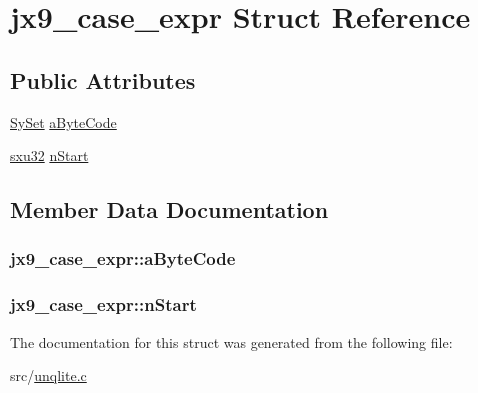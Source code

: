 \hypertarget{structjx9__case__expr}{\section{jx9\-\_\-case\-\_\-expr Struct Reference}
\label{d9/dd6/structjx9__case__expr}
}
\subsection*{Public Attributes}
\begin{DoxyCompactItemize}
\item 
\hyperlink{struct_sy_set}{Sy\-Set} \hyperlink{structjx9__case__expr_a7ab82c6423bf03840acb775e865c2f8e}{a\-Byte\-Code}
\item 
\hyperlink{unqlite_8c_abc5a8a3f345c200c98c485551f49666e}{sxu32} \hyperlink{structjx9__case__expr_ab12f71001095680b816069f5912ca694}{n\-Start}
\end{DoxyCompactItemize}


\subsection{Member Data Documentation}
\hypertarget{structjx9__case__expr_a7ab82c6423bf03840acb775e865c2f8e}{
\subsubsection[{a\-Byte\-Code}]{ jx9\-\_\-case\-\_\-expr\-::a\-Byte\-Code}}\label{d9/dd6/structjx9__case__expr_a7ab82c6423bf03840acb775e865c2f8e}
\hypertarget{structjx9__case__expr_ab12f71001095680b816069f5912ca694}{
\subsubsection[{n\-Start}]{ jx9\-\_\-case\-\_\-expr\-::n\-Start}}\label{d9/dd6/structjx9__case__expr_ab12f71001095680b816069f5912ca694}


The documentation for this struct was generated from the following file\-:\begin{DoxyCompactItemize}
\item 
src/\hyperlink{unqlite_8c}{unqlite.\-c}\end{DoxyCompactItemize}
